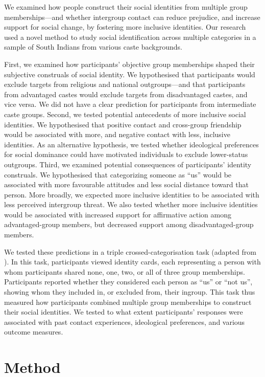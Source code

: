 \documentclass[12pt, a4paper]{article}
\begin{document}
We examined how people construct their social identities from multiple group memberships---and whether intergroup contact can reduce prejudice, and increase support for social change, by fostering more inclusive identities. Our research used a novel method to study social identification across multiple categories in a sample of South Indians from various caste backgrounds.

First, we examined how participants' objective group memberships shaped their subjective construals of social identity.  We hypothesised that participants would exclude targets from religious and national outgroups---and that participants from advantaged castes would exclude targets from disadvantaged castes, and vice versa. We did not have a clear prediction for participants from intermediate caste groups. Second, we tested potential antecedents of more inclusive social identities. We hypothesised that positive contact and cross-group friendship would be associated with more, and negative contact with less, inclusive identities. As an alternative hypothesis, we tested whether ideological preferences for social dominance \cite{sidanius_social_1999} could have motivated individuals to exclude lower-status outgroups. Third, we examined potential consequences of participants' identity construals. We hypothesised that categorizing someone as ``us'' would be associated with more favourable attitudes and less social distance toward that person. More broadly, we expected more inclusive identities to be associated with less perceived intergroup threat. We also tested whether more inclusive identities would be associated with increased support for affirmative action among advantaged-group members, but decreased support among disadvantaged-group members.

We tested these predictions in a triple crossed-categorisation task (adapted from ). In this task, participants viewed identity cards, each representing a person with whom participants shared none, one, two, or all of three group memberships. Participants reported whether they considered each person as ``us'' or ``not us'', showing whom they included in, or excluded from, their ingroup. This task thus measured how participants combined multiple group memberships to construct their social identities. We tested to what extent participants' responses were associated with past contact experiences, ideological preferences, and various outcome measures.

\section{Method}
\end{document}
